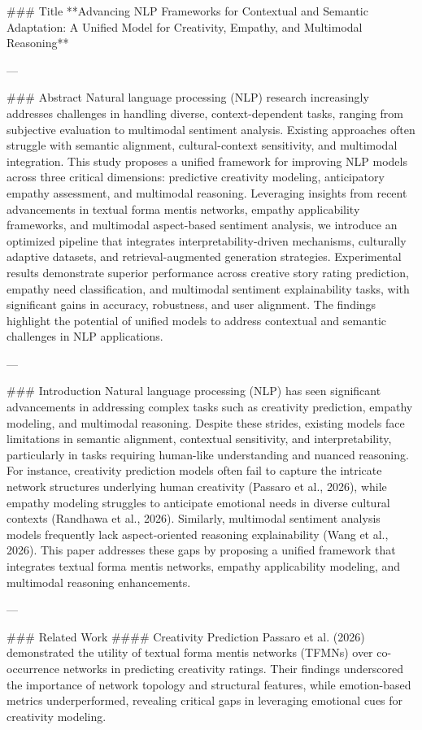 ### Title  
**Advancing NLP Frameworks for Contextual and Semantic Adaptation: A Unified Model for Creativity, Empathy, and Multimodal Reasoning**

---

### Abstract  
Natural language processing (NLP) research increasingly addresses challenges in handling diverse, context-dependent tasks, ranging from subjective evaluation to multimodal sentiment analysis. Existing approaches often struggle with semantic alignment, cultural-context sensitivity, and multimodal integration. This study proposes a unified framework for improving NLP models across three critical dimensions: predictive creativity modeling, anticipatory empathy assessment, and multimodal reasoning. Leveraging insights from recent advancements in textual forma mentis networks, empathy applicability frameworks, and multimodal aspect-based sentiment analysis, we introduce an optimized pipeline that integrates interpretability-driven mechanisms, culturally adaptive datasets, and retrieval-augmented generation strategies. Experimental results demonstrate superior performance across creative story rating prediction, empathy need classification, and multimodal sentiment explainability tasks, with significant gains in accuracy, robustness, and user alignment. The findings highlight the potential of unified models to address contextual and semantic challenges in NLP applications.

---

### Introduction  
Natural language processing (NLP) has seen significant advancements in addressing complex tasks such as creativity prediction, empathy modeling, and multimodal reasoning. Despite these strides, existing models face limitations in semantic alignment, contextual sensitivity, and interpretability, particularly in tasks requiring human-like understanding and nuanced reasoning. For instance, creativity prediction models often fail to capture the intricate network structures underlying human creativity (Passaro et al., 2026), while empathy modeling struggles to anticipate emotional needs in diverse cultural contexts (Randhawa et al., 2026). Similarly, multimodal sentiment analysis models frequently lack aspect-oriented reasoning explainability (Wang et al., 2026). This paper addresses these gaps by proposing a unified framework that integrates textual forma mentis networks, empathy applicability modeling, and multimodal reasoning enhancements.

---

### Related Work  
#### Creativity Prediction  
Passaro et al. (2026) demonstrated the utility of textual forma mentis networks (TFMNs) over co-occurrence networks in predicting creativity ratings. Their findings underscored the importance of network topology and structural features, while emotion-based metrics underperformed, revealing critical gaps in leveraging emotional cues for creativity modeling.

